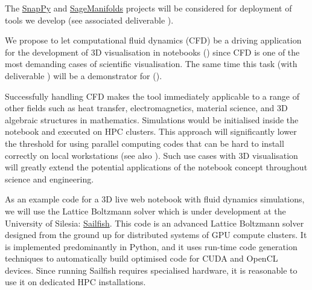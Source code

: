\begin{workpackage}
\begin{tasklist}
\begin{task}[title=Visualisation system for 3D data in web-notebook
,id=vis3d,lead=SR, partners={US,PS,USO}, PM=13, wphases=0-24, issue=76]
The \href{http://www.math.uic.edu/t3m/SnapPy/}{SnapPy} and
\href{http://sagemanifolds.obspm.fr/}{SageManifolds} projects will be
considered for deployment of tools we develop (see associated
deliverable ).
\end{task}


\begin{task}[title=Visualisation of 3D fluid dynamics data in web-notebook
,id=cfd-vis,lead=SR, partners={US,PS,USO},PM=5,wphases=12-36,issue=77]

We propose to let computational fluid dynamics (CFD) be a driving
application for the development of 3D visualisation in \Jupyter
notebooks () since CFD is one of the most demanding
cases of scientific visualisation. The same time this task
(with deliverable ) will be
a demonstrator for ().

Successfully handling CFD makes the tool immediately applicable to a
range of other fields such as heat transfer, electromagnetics,
material science, and 3D algebraic structures in
mathematics. Simulations would be initialised inside the notebook and
executed on HPC clusters. This approach will significantly lower the
threshold for using parallel computing codes that can be hard to
install correctly on local workstations (see also ). Such
use cases with 3D visualisation will greatly extend the potential
applications of the \Jupyter notebook concept throughout science and
engineering.

As an example code for a 3D live web notebook with fluid dynamics
simulations, we will use the Lattice Boltzmann solver which is under
development at the University of Silesia:
\href{http://sailfish.us.edu.pl/}{Sailfish}.  This code is an advanced
Lattice Boltzmann solver designed from the ground up for distributed
systems of GPU compute clusters. It is implemented predominantly in
Python, and it uses run-time code generation techniques to
automatically build optimised code for CUDA and OpenCL devices. Since
running Sailfish requires specialised hardware, it is reasonable to
use it on dedicated HPC installations.
\end{task}

\begin{task}[lead=UB,title=Common option system for various displays
  in Sage,id=Sage-display,PM=12,wphases=0-24,issue=78]


\end{task}
\end{tasklist}
\end{workpackage}
